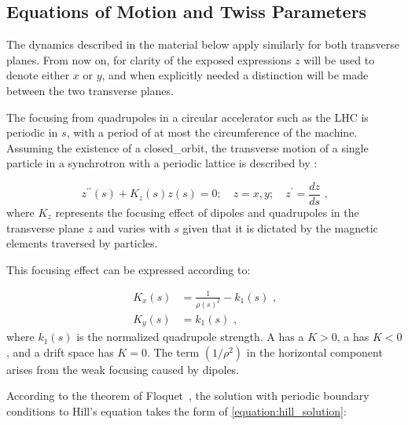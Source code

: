 \subsection{Equations of Motion and Twiss Parameters}
\label{subsection:equations_of_motion_and_twiss_parameters}

\begin{noteblock}
    The dynamics described in the material below apply similarly for both transverse planes.
    From now on, for clarity of the exposed expressions \(z\) will be used to denote either \(x\) or \(y\), and when explicitly needed a distinction will be made between the two transverse planes.
\end{noteblock}

The focusing from quadrupoles in a circular accelerator such as the \gls{LHC} is periodic in \(s\), with a period of at most the circumference of the machine.
Assuming the existence of a \gls{closed_orbit}, the transverse motion of a single particle in a synchrotron with a periodic lattice is described by :

\begin{equation}
    z^{\prime \prime}(s) + K_z(s) z(s) = 0; \quad z = x, y; \quad z^{\prime} = \dfrac{dz}{ds} \text{ ,}
    \label{equation:hill_equation}
\end{equation}
where \(K_z\) represents the focusing effect of dipoles and quadrupoles in the transverse plane \(z\) and varies with \(s\) given that it is dictated by the magnetic elements traversed by particles.

\noindent
This focusing effect can be expressed according to:

\begin{equation}
	\begin{aligned}
		K_x(s) &= \frac{1}{\rho(s)^2} - k_1(s) \text{ ,} \\
    	K_y(s) &= k_1(s) \text{ ,}
	\end{aligned}
    \label{equation:transverse_focusing_strengths}
\end{equation}
where \(k_1(s)\) is the normalized quadrupole strength.
A  has a \(K > 0\), a  has \(K < 0\), and a drift space has \(K = 0\).
The term \(\left(1 / \rho^2\right)\) in the horizontal component arises from the weak focusing caused by dipoles.

According to the theorem of Floquet~\cite{BOOK:Lee:Accelerator_physics}, the solution with periodic boundary conditions to Hill’s equation takes the form of \cref{equation:hill_solution}:

